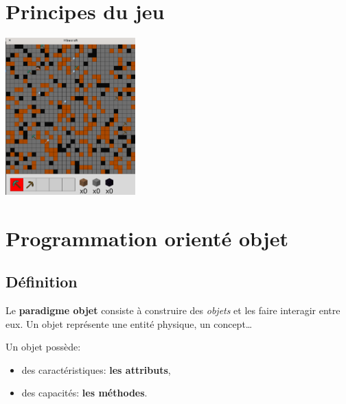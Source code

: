 \documentclass[a4paper,11pt]{article}
\begin{document}
\begin{center}
\end{center}
\section{Principes du jeu}
\begin{center}
    \centering
    \includegraphics[width=5cm]{ressources/jeu.png}
    \label{jeu}
\end{center}
\section{Programmation orienté objet}
\subsection{Définition}
Le \textbf{paradigme objet} consiste à construire des \emph{objets} et les faire interagir entre eux. Un objet représente une entité physique, un concept\dots 
\begin{aretenir}[]
    Un objet possède:
    \begin{itemize}
        \item des caractéristiques: \textbf{les attributs},
        \item des capacités: \textbf{les méthodes}.
    \end{itemize}
\end{aretenir}
\end{document}
